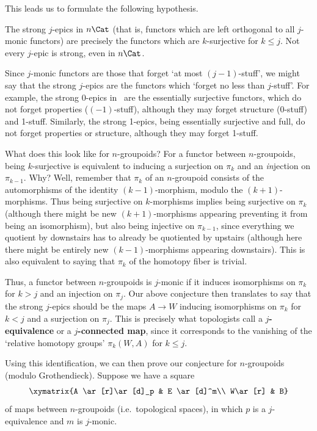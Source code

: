 \documentclass[12pt]{amsart}
\begin{document}
This leads us to formulate the following hypothesis.

\begin{hyp} \label{epimono}
  The strong $j$-epics in $n\Cat$ (that is, functors which are left
  orthogonal to all $j$-monic functors) are precisely the functors
  which are $k$-surjective for $k\le j$.  Not every $j$-epic is
  strong, even in $n\Cat$.
\end{hyp}

Since $j$-monic functors are those that forget `at most
$(j-1)$-stuff', we might say that the strong $j$-epics are the
functors which `forget no less than $j$-stuff'.  For example, the
strong 0-epics in \Cat\ are the essentially surjective functors, which
do not forget properties ($(-1)$-stuff), although they may forget
structure (0-stuff) and 1-stuff.  Similarly, the strong 1-epics, being
essentially surjective and full, do not forget properties or
structure, although they may forget 1-stuff.

What does this look like for $n$-groupoids?  For a functor between
$n$-groupoids, being $k$-surjective is equivalent to inducing a
surjection on $\pi_k$ and an \emph{in}jection on $\pi_{k-1}$.  Why?
Well, remember that $\pi_k$ of an $n$-groupoid consists of the
automorphisms of the identity $(k-1)$-morphism, modulo the
$(k+1)$-morphisms.  Thus being surjective on $k$-morphisms implies
being surjective on $\pi_k$ (although there might be new
$(k+1)$-morphisms appearing preventing it from being an isomorphism),
but also being injective on $\pi_{k-1}$, since everything we quotient
by downstairs has to already be quotiented by upstairs (although here
there might be entirely new $(k-1)$-morphisms appearing downstairs).
This is also equivalent to saying that $\pi_k$ of the homotopy fiber
is trivial.

Thus, a functor between $n$-groupoids is $j$-monic if it induces
isomorphisms on $\pi_k$ for $k > j$ and an injection on $\pi_{j}$.
Our above conjecture then translates to say that the strong $j$-epics
should be the maps $A\to W$ inducing isomorphisms on $\pi_k$ for $k<j$
and a surjection on $\pi_{j}$.  This is precisely what topologists
call a \textbf{$j$-equivalence} or a \textbf{$j$-connected map},
since it corresponds to the vanishing of the `relative homotopy
groups' $\pi_k(W,A)$ for $k\le j$.

Using this identification, we can then prove our conjecture for
$n$-groupoids (modulo Grothendieck).  Suppose we have a square
\[\xymatrix{A \ar[r]\ar[d]_p & E \ar[d]^m\\
  W\ar[r] & B}\]
of maps between $n$-groupoids (i.e.\ topological spaces), in which $p$
is a $j$-equivalence and $m$ is $j$-monic.
\end{document}
